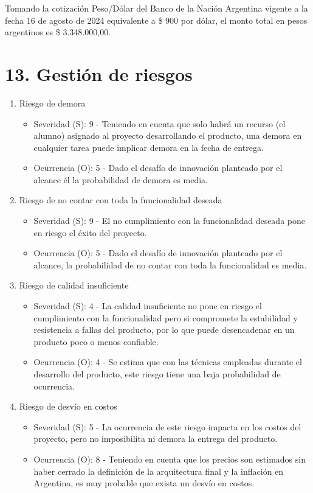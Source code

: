 \documentclass[
11pt, %
]{charter}
\begin{document}
Tomando la cotización Peso/Dólar del Banco de la Nación Argentina vigente a la fecha 16 de agosto de 2024 equivalente a \$ 900 por dólar, el monto total en pesos argentinos es \$ 3.348.000,00.


\section{13. Gestión de riesgos}
\label{sec:riesgos}

\begin{enumerate}
\item Riesgo de demora
\begin{itemize}
	\item Severidad (S): 9 - Teniendo en cuenta que solo habrá un recurso (el alumno) asignado al proyecto desarrollando el producto, una demora en cualquier tarea puede implicar demora en la fecha de entrega.
	\item Ocurrencia (O): 5 - Dado el desafío de innovación planteado por el alcance él la probabilidad de demora es media.
\end{itemize}

\vspace{3em}

\item Riesgo de no contar con toda la funcionalidad deseada
\begin{itemize}
	\item Severidad (S): 9 - El no cumplimiento con la funcionalidad deseada pone en riesgo el éxito del proyecto.
	\item Ocurrencia (O): 5 - Dado el desafío de innovación planteado por el alcance, la probabilidad de no contar con toda la funcionalidad es media.
\end{itemize}

\item Riesgo de calidad insuficiente
\begin{itemize}
	\item Severidad (S): 4 - La calidad insuficiente no pone en riesgo el cumplimiento con la funcionalidad pero si compromete la estabilidad y resistencia a fallas del producto, por lo que puede desencadenar en un producto poco o menos confiable.
	\item Ocurrencia (O): 4 - Se estima que con las técnicas empleadas durante el desarrollo del producto, este riesgo tiene una baja probabilidad de ocurrencia.
\end{itemize}


\item Riesgo de desvío en costos
\begin{itemize}
	\item Severidad (S): 5 - La ocurrencia de este riesgo impacta en los costos del proyecto, pero no imposibilita ni demora la entrega del producto.
	\item Ocurrencia (O): 8 - Teniendo en cuenta que los precios son estimados sin haber cerrado la definición de la arquitectura final y la inflación en Argentina, es muy probable que exista un desvío en costos.
\end{itemize}


\end{enumerate}
\end{document}
